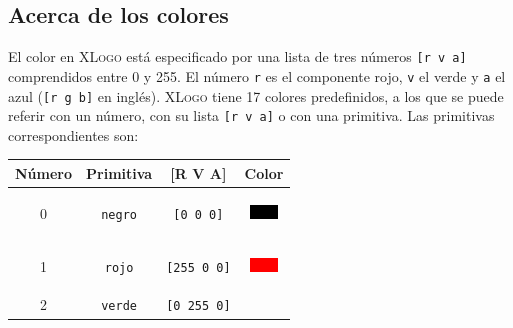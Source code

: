 \subsection{Acerca de los colores}
   \label{AcercaColores}

El color en \textsc{XLogo} est\'a especificado por una lista de tres n\'umeros
\texttt{[r v a]} comprendidos entre 0 y 255. El n\'umero \texttt{r} es
el componente rojo, \texttt{v} el verde y \texttt{a} el azul
(\texttt{[r g b]} en ingl\'es). \textsc{XLogo} tiene 17 colores predefinidos, a
los que se puede referir con un n\'umero, con su lista \texttt{[r~v~a]}
o con una primitiva. Las primitivas correspondientes son:
\begin{center} \begin{longtable}{|*{4}{c|}} \hline  
    \textbf{N\'umero} & \textbf{Primitiva} & \textbf{[R V A]} & \textbf{Color}
             \\ \endhead \hline
    0 & \texttt{negro} \index{negro@\texttt{negro}}
      & \texttt{[0   0   0]} & \begin{minipage}[m]{1.5cm} \begin{center}
           \vspace{0.2cm} %
              \includegraphics{Imagenes/05_Primitivas/00_negro.png}
           \vspace{0.2cm} \end{center} \end{minipage} \\ \hline
    1 & \texttt{rojo} \index{rojo@\texttt{rojo}}
      & \texttt{[255  0   0]} & \begin{minipage}[m]{1.5cm} \begin{center}
                 \vspace{0.2cm} %
              \includegraphics{Imagenes/05_Primitivas/01_rojo.png}
                 \vspace{0.2cm} \end{center} \end{minipage} \\ \hline
    2 & \texttt{verde} \index{verde@\texttt{verde}}
      & \texttt{[0  255  0]} & \begin{minipage}[m]{1.5cm} \begin{center}

\end{center}
\end{minipage}
\end{longtable}
\end{center}
